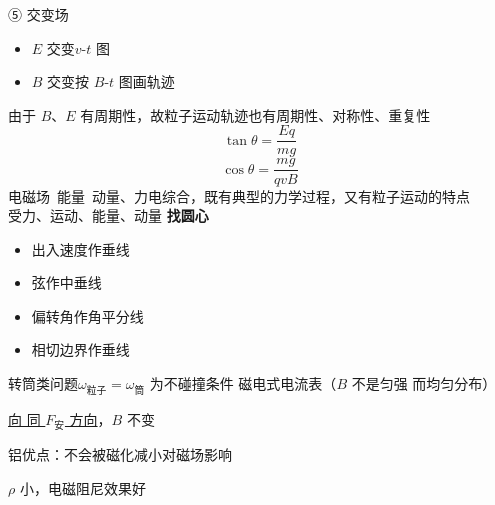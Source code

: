 ⑤ 交变场
\begin{itemize}
\item $E$ 交变\quad $v$-$t$ 图
\item $B$ 交变\quad 按 $B$-$t$ 图画轨迹
\end{itemize}
由于 $B$、$E$ 有周期性，故粒子运动轨迹也有周期性、对称性、重复性
\[
\tan\theta=\frac{Eq}{mg}
\]
\[
\cos\theta=\frac{mg}{qvB}
\]
电磁场\ 能量\ 动量、力电综合，既有典型的力学过程，又有粒子运动的特点\\
\hspace*{2em}受力、运动、能量、动量
\textbf{找圆心}
\begin{itemize}
\item 出入速度作垂线 %
\item 弦作中垂线 %
\item 偏转角作角平分线
\item 相切边界作垂线
\end{itemize}
转筒类问题\quad $\omega_{\text{粒子}}=\omega_{\text{筒}}$ 为不碰撞条件 %
磁电式电流表（$B$ 不是匀强 而均匀分布）

\underline{向 同 $F_{\text{安}}$ 方向}，$B$ 不变

铝优点：不会被磁化\quad 减小对磁场影响

$\rho$ 小，电磁阻尼效果好 %

